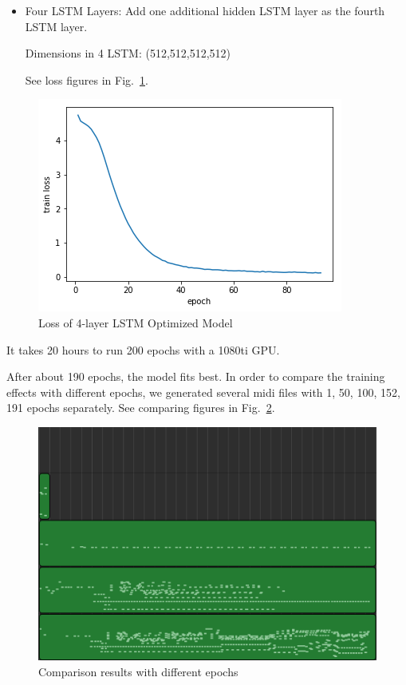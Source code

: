 \documentclass[conference]{IEEEtran}
\begin{document}
\begin{itemize}
\item Four LSTM Layers: Add one additional hidden LSTM layer as the fourth LSTM layer. 

Dimensions in 4 LSTM: (512,512,512,512)

See loss figures in Fig.~\ref{fig3}.
\end{itemize}

\begin{figure}[htbp]
\centerline{\includegraphics[scale=0.6]{pics/log_4lstm.png}}
\caption{Loss of 4-layer LSTM Optimized Model}
\label{fig3}
\end{figure}


It takes 20 hours to run 200 epochs with a 1080ti GPU.

After about 190 epochs, the model fits best.
In order to compare the training effects with different epochs, we generated several midi files with 1, 50, 100, 152, 191 epochs separately. See comparing figures in Fig.~\ref{fig4}.

\begin{figure}[htbp]
\centerline{\includegraphics[scale=0.45]{compare_results.png}}
\caption{Comparison results with different epochs\protect\footnotemark}
\label{fig4}
\end{figure}
\end{document}
